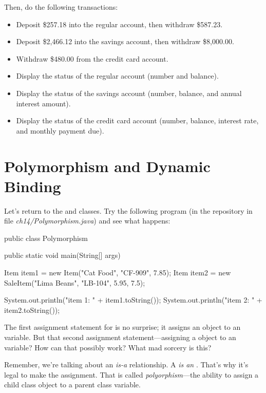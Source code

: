 \begin{exercise}
Then, do the following transactions:

\begin{itemize}
\item Deposit \$257.18 into the regular account, then withdraw \$587.23.
\item Deposit \$2,466.12 into the savings account, then withdraw \$8,000.00.
\item Withdraw \$480.00 from the credit card account.
\item Display the status of the regular account (number and balance).
\item Display the status of the savings account (number, balance, and annual interest amount).
\item Display the status of the credit card account (number, balance, interest rate, and monthly payment due).
\end{itemize}


\end{exercise}

\section{Polymorphism and Dynamic Binding}

Let's return to the  and  classes.  Try the following program (in the repository in file {\em ch14/Polymorphism.java}) and see what happens:

\begin{code}
public class Polymorphism {
    public static void main(String[] args) {
        Item item1 = new Item("Cat Food", "CF-909", 7.85);
        Item item2 = new SaleItem("Lima Beans", "LB-104",
            5.95, 7.5);
            
        System.out.println("item 1: " + item1.toString());
        System.out.println("item 2: " + item2.toString());
    }
}
\end{code}

The first assignment statement for  is no surprise; it assigns an  object to an  variable. But that second assignment statement---assigning a  object to an  variable? How can that possibly work? What mad sorcery is this?

Remember, we're talking about an {\em is-a} relationship. A  {\em is an} . That's why it's legal to make the assignment. That is called {\em polyorphism}---the ability to assign a child class object to a parent class variable.

